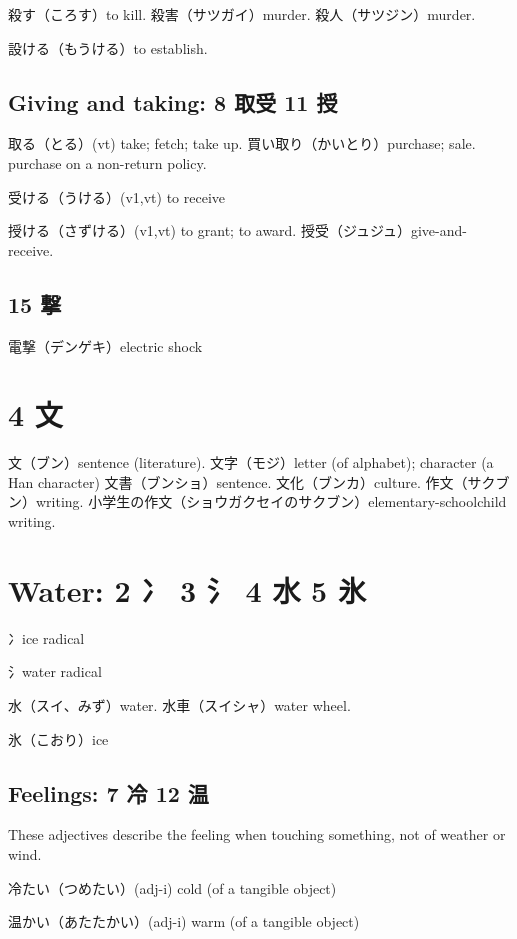 殺す（ころす）to kill.
殺害（サツガイ）murder.
殺人（サツジン）murder.

設ける（もうける）to establish.

\subsection{Giving and taking: 8 取受 11 授}

取る（とる）(vt) take; fetch; take up.
買い取り（かいとり）purchase; sale. purchase on a non-return policy.

受ける（うける）(v1,vt) to receive

授ける（さずける）(v1,vt) to grant; to award.
授受（ジュジュ）give-and-receive.

\subsection{15 撃}

電撃（デンゲキ）electric shock

\section{4 文}

文（ブン）sentence (literature).
文字（モジ）letter (of alphabet); character (a Han character)
文書（ブンショ）sentence.
文化（ブンカ）culture.
作文（サクブン）writing.
小学生の作文（ショウガクセイのサクブン）elementary-schoolchild writing.

\section{Water: 2 冫 3 氵 4 水 5 氷}

冫ice radical

氵water radical

水（スイ、みず）water.
水車（スイシャ）water wheel.

氷（こおり）ice

\subsection{Feelings: 7 冷 12 温}

These adjectives describe the feeling when
touching something, not of weather or wind.

冷たい（つめたい）(adj-i) cold (of a tangible object)

温かい（あたたかい）(adj-i) warm (of a tangible object)

